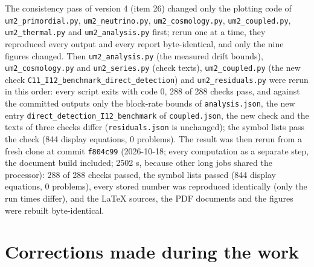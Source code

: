 \documentclass[
  10pt,
]{article}
\begin{document}
The consistency pass of version 4 (item 26) changed only the plotting
code of \texttt{um2\_primordial.py}, \texttt{um2\_neutrino.py},
\texttt{um2\_cosmology.py}, \texttt{um2\_coupled.py},
\texttt{um2\_thermal.py} and \texttt{um2\_analysis.py} first; rerun one
at a time, they reproduced every output and every report byte-identical,
and only the nine figures changed. Then \texttt{um2\_analysis.py} (the
measured drift bounds), \texttt{um2\_cosmology.py} and
\texttt{um2\_series.py} (check texts), \texttt{um2\_coupled.py} (the new
check \texttt{C11\_I12\_benchmark\_direct\_detection}) and
\texttt{um2\_residuals.py} were rerun in this order: every script exits
with code 0, 288 of 288 checks pass, and against the committed outputs
only the block-rate bounds of \texttt{analysis.json}, the new entry
\texttt{direct\_detection\_I12\_benchmark} of \texttt{coupled.json}, the
new check and the texts of three checks differ (\texttt{residuals.json}
is unchanged); the symbol lists pass the check (844 display equations, 0
problems). The result was then rerun from a fresh clone at commit
\texttt{f804c99} (2026-10-18; every computation as a separate step, the
document build included; 2502 s, because other long jobs shared the
processor): 288 of 288 checks passed, the symbol lists passed (844
display equations, 0 problems), every stored number was reproduced
identically (only the run times differ), and the LaTeX sources, the PDF
documents and the figures were rebuilt byte-identical.

\hypertarget{corrections-made-during-the-work}{%
\section{Corrections made during the
work}\label{corrections-made-during-the-work}}
\end{document}
